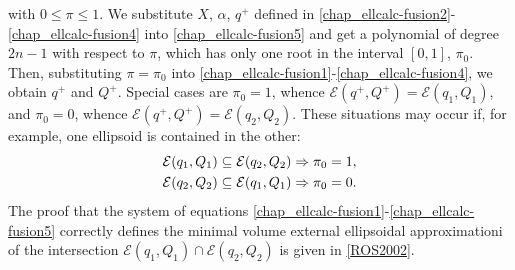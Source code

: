 \documentclass[letterpaper,10pt,english]{sphinxmanual}
\begin{document}
with $0\leqslant\pi\leqslant1$. We substitute $X$,
$\alpha$, $q^+$ defined in \eqref{chap_ellcalc-fusion2}-\eqref{chap_ellcalc-fusion4} into
\eqref{chap_ellcalc-fusion5} and get a polynomial of degree $2n-1$ with respect to
$\pi$, which has only one root in the interval $[0,1]$,
$\pi_0$. Then, substituting $\pi=\pi_0$ into
\eqref{chap_ellcalc-fusion1}-\eqref{chap_ellcalc-fusion4}, we obtain $q^+$ and $Q^+$. Special
cases are $\pi_0=1$, whence
${\mathcal E}(q^+,Q^+)={\mathcal E}(q_1,Q_1)$, and
$\pi_0=0$, whence
${\mathcal E}(q^+,Q^+)={\mathcal E}(q_2,Q_2)$. These situations
may occur if, for example, one ellipsoid is contained in the other:
\begin{gather}
\begin{split}{\mathcal E}(q_1,Q_1)\subseteq{\mathcal E}(q_2,Q_2) & \Rightarrow \pi_0 = 1,\\
{\mathcal E}(q_2,Q_2)\subseteq{\mathcal E}(q_1,Q_1) & \Rightarrow \pi_0 = 0.\end{split}\notag
\end{gather}
The proof that the system of equations \eqref{chap_ellcalc-fusion1}-\eqref{chap_ellcalc-fusion5} correctly
defines the minimal volume external ellipsoidal approximationi of the
intersection ${\mathcal E}(q_1,Q_1)\cap{\mathcal E}(q_2,Q_2)$ is
given in {\hyperref[chap_ellcalc:ros2002]{{[}ROS2002{]}}}.
\end{document}
